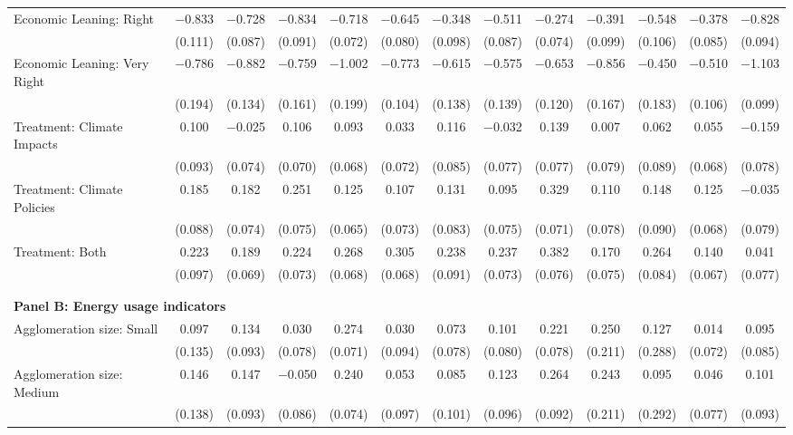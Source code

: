 \begin{tabular}{@{\extracolsep{5pt}}lcccccccccccc}
  Economic Leaning: Right & $-$0.833 & $-$0.728 & $-$0.834 & $-$0.718 & $-$0.645 & $-$0.348 & $-$0.511 & $-$0.274 & $-$0.391 & $-$0.548 & $-$0.378 & $-$0.828 \\ 
  & (0.111) & (0.087) & (0.091) & (0.072) & (0.080) & (0.098) & (0.087) & (0.074) & (0.099) & (0.106) & (0.085) & (0.094) \\ 
  Economic Leaning: Very Right & $-$0.786 & $-$0.882 & $-$0.759 & $-$1.002 & $-$0.773 & $-$0.615 & $-$0.575 & $-$0.653 & $-$0.856 & $-$0.450 & $-$0.510 & $-$1.103 \\ 
  & (0.194) & (0.134) & (0.161) & (0.199) & (0.104) & (0.138) & (0.139) & (0.120) & (0.167) & (0.183) & (0.106) & (0.099) \\ 
  Treatment: Climate Impacts & 0.100 & $-$0.025 & 0.106 & 0.093 & 0.033 & 0.116 & $-$0.032 & 0.139 & 0.007 & 0.062 & 0.055 & $-$0.159 \\ 
  & (0.093) & (0.074) & (0.070) & (0.068) & (0.072) & (0.085) & (0.077) & (0.077) & (0.079) & (0.089) & (0.068) & (0.078) \\ 
  Treatment: Climate Policies & 0.185 & 0.182 & 0.251 & 0.125 & 0.107 & 0.131 & 0.095 & 0.329 & 0.110 & 0.148 & 0.125 & $-$0.035 \\ 
  & (0.088) & (0.074) & (0.075) & (0.065) & (0.073) & (0.083) & (0.075) & (0.071) & (0.078) & (0.090) & (0.068) & (0.079) \\ 
  Treatment: Both & 0.223 & 0.189 & 0.224 & 0.268 & 0.305 & 0.238 & 0.237 & 0.382 & 0.170 & 0.264 & 0.140 & 0.041 \\ 
  & (0.097) & (0.069) & (0.073) & (0.068) & (0.068) & (0.091) & (0.073) & (0.076) & (0.075) & (0.084) & (0.067) & (0.077) \\ 
 \\[1ex] \hline \\[1ex]
\multicolumn{ 13 }{l}{\textbf{ Panel B: Energy usage indicators }} \\
  Agglomeration size: Small & 0.097 & 0.134 & 0.030 & 0.274 & 0.030 & 0.073 & 0.101 & 0.221 & 0.250 & 0.127 & 0.014 & 0.095 \\ 
  & (0.135) & (0.093) & (0.078) & (0.071) & (0.094) & (0.078) & (0.080) & (0.078) & (0.211) & (0.288) & (0.072) & (0.085) \\ 
  Agglomeration size: Medium & 0.146 & 0.147 & $-$0.050 & 0.240 & 0.053 & 0.085 & 0.123 & 0.264 & 0.243 & 0.095 & 0.046 & 0.101 \\ 
  & (0.138) & (0.093) & (0.086) & (0.074) & (0.097) & (0.101) & (0.096) & (0.092) & (0.211) & (0.292) & (0.077) & (0.093) \\ 

\end{tabular}
